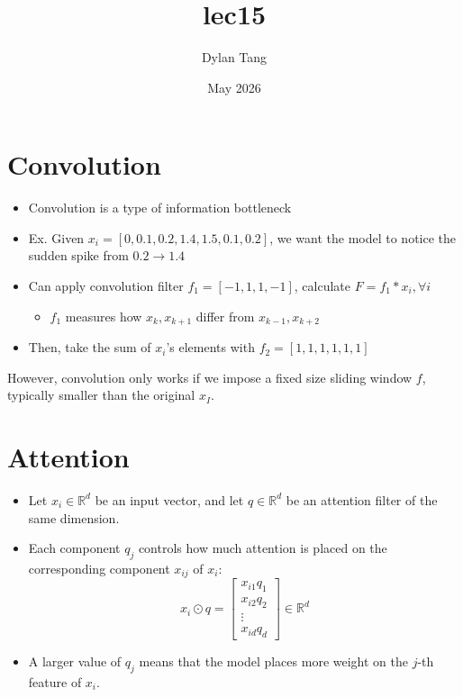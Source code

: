 \documentclass{article}
\title{lec15}
\author{Dylan Tang}
\date{May 2026}
\begin{document}
\maketitle

\section{Convolution}
\begin{itemize}
    \item Convolution is a type of information bottleneck
    \item Ex. Given $x_i = [0, 0.1, 0.2, 1.4, 1.5, 0.1, 0.2]$, we want the model to notice the sudden spike from $0.2 \rightarrow 1.4$
    \item Can apply convolution filter $f_1 = [-1, 1, 1, -1]$, calculate $F = f_1 * x_i, \forall i$
        \begin{itemize}
            \item $f_1$ measures how $x_k, x_{k+1}$ differ from $x_{k-1}, x_{k+2}$
        \end{itemize}
    \item Then, take the sum of $x_i$'s elements with $f_2 = [1,1,1,1,1,1]$
\end{itemize}

However, convolution only works if we impose a fixed size sliding window $f$, typically smaller than the original $x_I$.

\section{Attention}

\begin{itemize}
    \item Let $x_i \in \mathbb{R}^d$ be an input vector, and let $q \in \mathbb{R}^d$ be an attention filter of the same dimension.
    
    \item Each component $q_j$ controls how much attention is placed on the corresponding component $x_{ij}$ of $x_i$:
    \[
        x_i \odot q =
        \begin{bmatrix}
            x_{i1}q_1 \\
            x_{i2}q_2 \\
            \vdots \\
            x_{id}q_d
        \end{bmatrix} \in \mathbb{R}^d
    \]
    
    \item A larger value of $q_j$ means that the model places more weight on the $j$-th feature of $x_i$.
\end{itemize}
\end{document}
